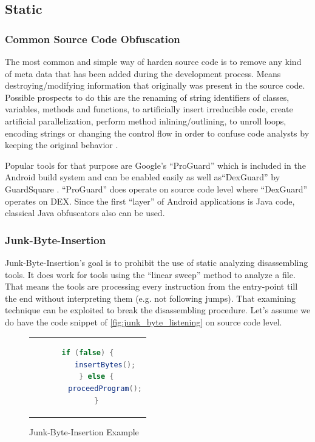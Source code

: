 \subsection{Static}
\subsubsection{Common Source Code Obfuscation}
The most common and simple way of harden source code is to remove any kind of meta data
that has been added during the development process. Means destroying/modifying
information that originally was present in the source code.
Possible prospects to do this are the renaming of string identifiers of
classes, variables, methods and functions, to artificially insert
irreducible code, create artificial parallelization, perform method inlining/outlining, to unroll loops, encoding strings or changing the control flow in
order to confuse code analysts by keeping the original behavior
\parencite{lvl_imp}.

Popular tools for that purpose are Google's ``ProGuard''
\parencite{proguardtool} which is included in the Android build system and
can be enabled easily as well as``DexGuard'' by GuardSquare
\parencite{dexguardtool}. ``ProGuard'' does
operate on source code level where ``DexGuard'' operates on DEX.
Since the first ``layer'' of Android applications is Java code, classical Java
obfuscators also can be used.

\subsubsection{Junk-Byte-Insertion}
Junk-Byte-Insertion's goal is to prohibit the use of static analyzing
disassembling tools. It does work for tools using the
``linear sweep'' method to analyze a file. That means
the tools are processing every instruction from the entry-point
till the end without interpreting them (e.g. not following jumps).
That examining technique can be exploited to break the disassembling
procedure. Let's assume we do have the code snippet of
\autoref{fig:junk_byte_listening}
on source code level.

\begin{figure}[htb]
  \centering
  \begin{tabular}{c}
  \begin{lstlisting}[language=Java]
    if (false) {
        insertBytes();
    } else {
        proceedProgram();
    }
  \end{lstlisting}
  \end{tabular}
  \caption[Junk-Byte-Insertion]{Junk-Byte-Insertion Example}
  \label{fig:junk_byte_listening}
\end{figure}

